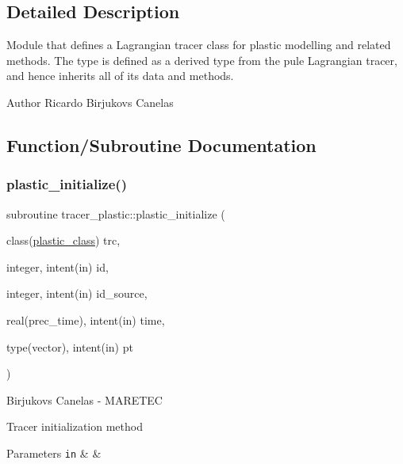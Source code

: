 \subsection{Detailed Description}
Module that defines a Lagrangian tracer class for plastic modelling and related methods. The type is defined as a derived type from the pule Lagrangian tracer, and hence inherits all of it\textquotesingle{}s data and methods. 

\begin{DoxyAuthor}{Author}
Ricardo Birjukovs Canelas 
\end{DoxyAuthor}


\subsection{Function/\+Subroutine Documentation}
\mbox{\label{namespacetracer__plastic_a9a4e16b71bcd88b95c80ddb9c3ddb7d1}} 
\subsubsection{\texorpdfstring{plastic\+\_\+initialize()}{plastic\_initialize()}}
{\footnotesize\ttfamily subroutine tracer\+\_\+plastic\+::plastic\+\_\+initialize (\begin{DoxyParamCaption}\item[{class(\hyperlink{structtracer__plastic_1_1plastic__class}{plastic\+\_\+class})}]{trc,  }\item[{integer, intent(in)}]{id,  }\item[{integer, intent(in)}]{id\+\_\+source,  }\item[{real(prec\+\_\+time), intent(in)}]{time,  }\item[{type(vector), intent(in)}]{pt }\end{DoxyParamCaption})\hspace{0.3cm}{\ttfamily [private]}}



Birjukovs Canelas -\/ M\+A\+R\+E\+T\+EC 

Tracer initialization method 
\begin{DoxyParams}[1]{Parameters}
\mbox{\tt in}  & {\em } & \\
\hline
\end{DoxyParams}
